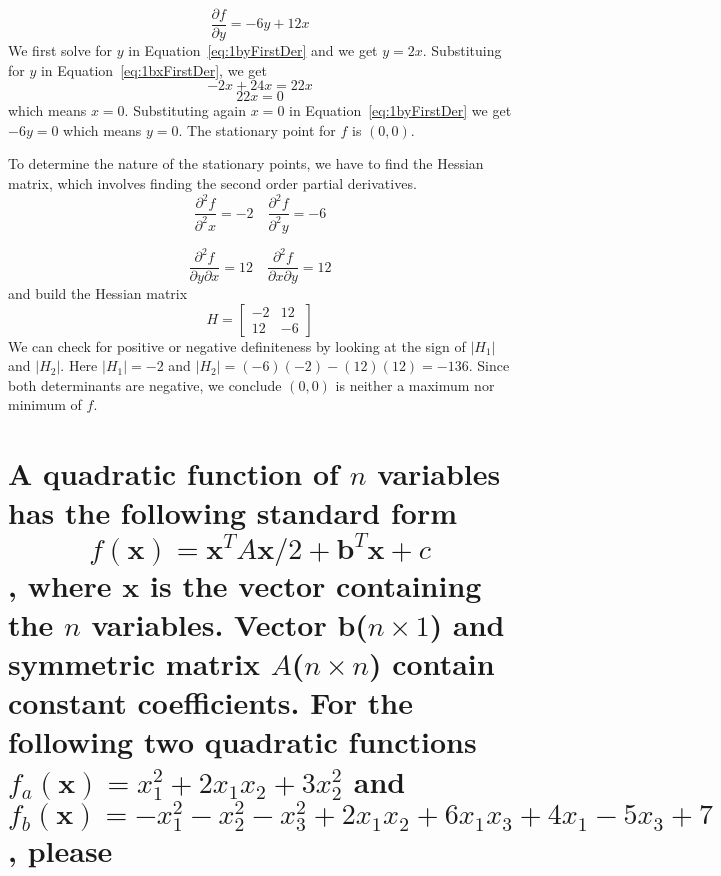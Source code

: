 \documentclass[11pt]{scrartcl}
\newcommand{\vect}{\boldsymbol}
\begin{document}
\begin{equation}
	\label{eq:1byFirstDer}
	\frac{\partial f}{\partial y} = -6y + 12x
\end{equation}
We first solve for $y$ in Equation~\ref{eq:1byFirstDer} and we get $y=2x$.
Substituing for $y$ in Equation~\ref{eq:1bxFirstDer}, we get 
$$-2x + 24x = 22x$$
$$22x = 0$$
which means $x=0$.
Substituting again $x=0$ in Equation~\ref{eq:1byFirstDer} we get $-6y=0$ which means
$y=0$.
The stationary point for $f$ is $(0, 0)$.

To determine the nature of the stationary points, we have to find the Hessian matrix,
which involves finding the second order partial derivatives.
\begin{equation}
	\frac{\partial^{2} f}{\partial^{2} x}=-2\quad \frac{\partial^{2}f}{\partial^{2}y} = -6
\end{equation}

\begin{equation}
	\frac{\partial^{2} f}{\partial y\partial x}=12\quad \frac{\partial^{2}f}{\partial x\partial y} = 12
\end{equation}
and build the Hessian matrix
$$
H = 
\begin{bmatrix}
	-2 & 12\\
	12 & -6
\end{bmatrix}
$$
We can check for positive or negative definiteness by looking at the sign of $|H_1|$ and $|H_{2}|$.
Here $|H_1| = -2$ and $|H_2| = (-6)(-2) -(12)(12) = -136$.
Since both determinants are negative, we conclude $(0, 0)$ is neither a maximum nor minimum of $f$.

\section{A quadratic function of $n$ variables has the following standard form
		$$f(\vect{x}) = \vect{x}^{T}A\vect{x}/2 + \vect{b}^{T}\vect{x} +c$$, 
		where $\vect{x}$ is the vector containing the $n$ variables.
		Vector $\vect{b}$($n\times1$) and symmetric matrix $A$($n\times n$) contain
		constant coefficients.
		For the following two quadratic functions $f_a (\vect{x})=x_{1}^{2}+2x_{1}x_{2}+3x_{2}^{2}$
		and $f_b (\vect{x})=-x_{1}^{2}-x_{2}^{2}-x_{3}^{2}+2x_{1}x_{2}+6x_{1}x_{3}+4x_{1}-5x_{3}+7$, please
}
\end{document}
